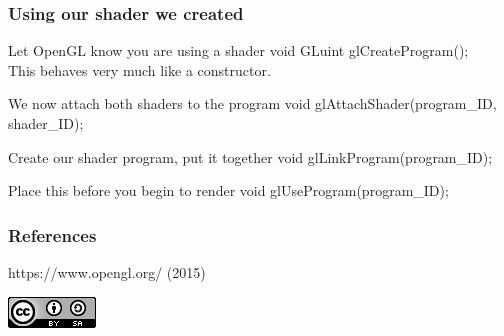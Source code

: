 \documentclass{beamer}
\begin{document}
\begin{frame}

  \frametitle{Using our shader we created}

  \begin{block}{Let OpenGL know you are using a shader}
    void GLuint glCreateProgram();\\
    This behaves very much like a constructor.
  \end{block}

  \begin{block}{We now attach both shaders to the program}
    void glAttachShader(program\_ID, shader\_ID);
  \end{block}

  \begin{block}{Create our shader program, put it together}
    void glLinkProgram(program\_ID);
  \end{block}

  \begin{block}{Place this before you begin to render}
    void glUseProgram(program\_ID);
  \end{block}

\end{frame}

\begin{frame}
  \frametitle{References}
  \footnotesize{
    \begin{thebibliography}{99}

     https://www.opengl.org/ (2015)
    \end{thebibliography}
  }
  \includegraphics[scale=.33]{../cc.png}

\end{frame}
\end{document}
